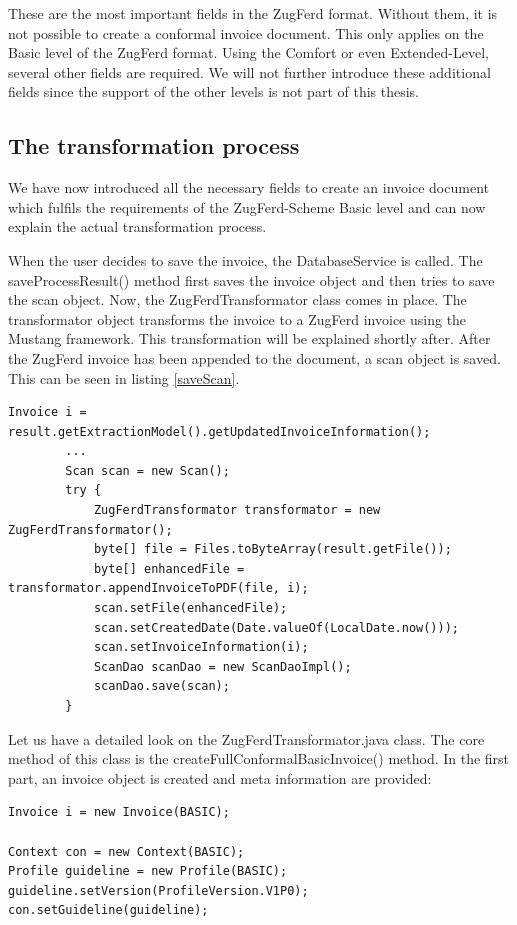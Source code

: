 These are the most important fields in the ZugFerd format. Without them, it is not possible to create a conformal invoice document. This only applies on the Basic level of the ZugFerd format. Using the Comfort or even Extended-Level, several other fields are required. We will not further introduce these additional fields since the support of the other levels is not part of this thesis. 

\subsection{The transformation process}
\label{sec5.7.2}

We have now introduced all the necessary fields to create an invoice document which fulfils the requirements of the ZugFerd-Scheme Basic level and can now explain the actual transformation process. 

When the user decides to save the invoice, the DatabaseService is called. The saveProcessResult() method first saves the invoice object and then tries to save the scan object. Now, the ZugFerdTransformator class comes in place. The transformator object transforms the invoice to a ZugFerd invoice using the Mustang framework. This transformation will be explained shortly after. After the ZugFerd invoice has been appended to the document, a scan object is saved. This can be seen in listing \ref{saveScan}.

\begin{lstlisting}[caption={}, label={saveScan}]
        Invoice i = result.getExtractionModel().getUpdatedInvoiceInformation();
        ...
        Scan scan = new Scan();
        try {
            ZugFerdTransformator transformator = new ZugFerdTransformator();
            byte[] file = Files.toByteArray(result.getFile());
            byte[] enhancedFile = transformator.appendInvoiceToPDF(file, i);
            scan.setFile(enhancedFile);
            scan.setCreatedDate(Date.valueOf(LocalDate.now()));
            scan.setInvoiceInformation(i);
            ScanDao scanDao = new ScanDaoImpl();
            scanDao.save(scan);
        }
\end{lstlisting}

Let us have a detailed look on the ZugFerdTransformator.java class. The core method of this class is the createFullConformalBasicInvoice() method. 
In the first part, an invoice object is created and meta information are provided:

\begin{lstlisting}[caption={Creation of the invoice object}]
Invoice i = new Invoice(BASIC);

Context con = new Context(BASIC);
Profile guideline = new Profile(BASIC);
guideline.setVersion(ProfileVersion.V1P0);
con.setGuideline(guideline);
\end{lstlisting}

